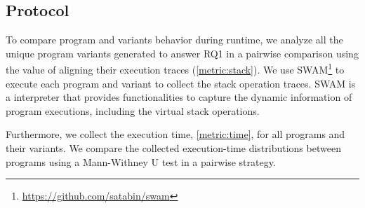 
\subsection*{Protocol}

To compare program and variants behavior during runtime, we analyze all the unique program variants generated to answer RQ1 in a pairwise comparison using the value of aligning their execution traces (\autoref{metric:stack}). We use SWAM\footnote{\url{https://github.com/satabin/swam}} to execute each program and variant to collect the stack operation traces. SWAM is a \wasm interpreter that provides functionalities to capture the dynamic information of \wasm program executions, including the virtual stack operations.

Furthermore, we collect the execution time, \autoref{metric:time}, for all programs and their variants. We compare the collected execution-time distributions between programs using a Mann-Withney U test \cite{mann1947} in a pairwise strategy.


 